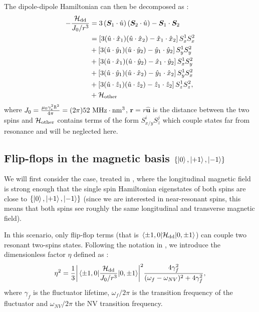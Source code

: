 \documentclass[preprintnumbers,amsmath,amssymb,onecolumn,12pt]{revtex4-2}\usepackage{graphicx}%
\begin{document}
The dipole-dipole Hamiltonian can then be decomposed as :
\begin{align}
-\frac{\mathcal{H}_{\rm dd}}{J_0/r^3}&= 3\left({\bm S}_1 \cdot \hat{u} \right)\left({\bm S}_2 \cdot \hat{u} \right) - {\bm S}_1 \cdot {\bm S}_2  \\
&=\left[3(\hat{u}\cdot\hat{x}_1)(\hat{u}\cdot\hat{x}_2) -\hat{x}_1\cdot\hat{x}_2\right] S_x^1S_x^2 \\
&+\left[3(\hat{u}\cdot\hat{y}_1)(\hat{u}\cdot\hat{y}_2) -\hat{y}_1\cdot\hat{y}_2\right] S_y^1S_y^2 \\
&+\left[3(\hat{u}\cdot\hat{x}_1)(\hat{u}\cdot\hat{y}_2) -\hat{x}_1\cdot\hat{y}_2\right] S_x^1S_y^2 \\
&+\left[3(\hat{u}\cdot\hat{y}_1)(\hat{u}\cdot\hat{x}_2) -\hat{y}_1\cdot\hat{x}_2\right] S_y^1S_x^2 \\
&+\left[3(\hat{u}\cdot\hat{z}_1)(\hat{u}\cdot\hat{z}_2) -\hat{z}_1\cdot\hat{z}_2\right] S_z^1S_z^2, \\
&+\mathcal{H}_{\rm other}
\end{align}
where $J_0=\frac{\mu_0 \gamma_e^2 \hbar^2}{4 \pi} = (2 \pi) 52\ \rm MHz \cdot \rm{nm}^3$, $\bm r= r\bm{\hat u}$ is the distance between the two spins and  $\mathcal{H}_{\rm other}$ contains terms of the form $S_{x/y}^iS_z^j$ which couple states far from resonance and will be neglected here.

\subsection{Flip-flops in the magnetic basis $\{ \ket{0},\ket{+1},\ket{-1} \} $}
We will first consider the case, treated in \cite{choi_depolarization_2017}, where the longitudinal magnetic field is strong enough that the single spin Hamiltonian eigenstates of both spins are close to $\{ \ket{0},\ket{+1},\ket{-1} \} $ (since we are interested in near-resonant spins, this means that both spins see roughly the same longitudinal and transverse magnetic field).

In this scenario, only flip-flop terms (that is $\mel{\pm 1,0}{\mathcal{H}_{\rm dd}}{0,\pm 1}$) can couple two resonant two-spins states. Following the notation in \cite{choi_depolarization_2017}, we introduce the dimensionless factor $\eta$ defined as : 
\begin{equation}
\eta^2=\frac{1}{3} \abs{\mel{\pm 1,0}{\frac{\mathcal{H}_{\rm dd}}{J_0/r^3}}{0,\pm 1}}^2  \frac{4\gamma_f^2}{(\omega_f - \omega_{NV})^2+4\gamma_f^2},
\end{equation}
where $\gamma_f$ is the fluctuator lifetime, $\omega_f/2\pi$ is the transition frequency of the fluctuator and $\omega_{NV}/2\pi$ the NV transition frequency. %
\end{document}
